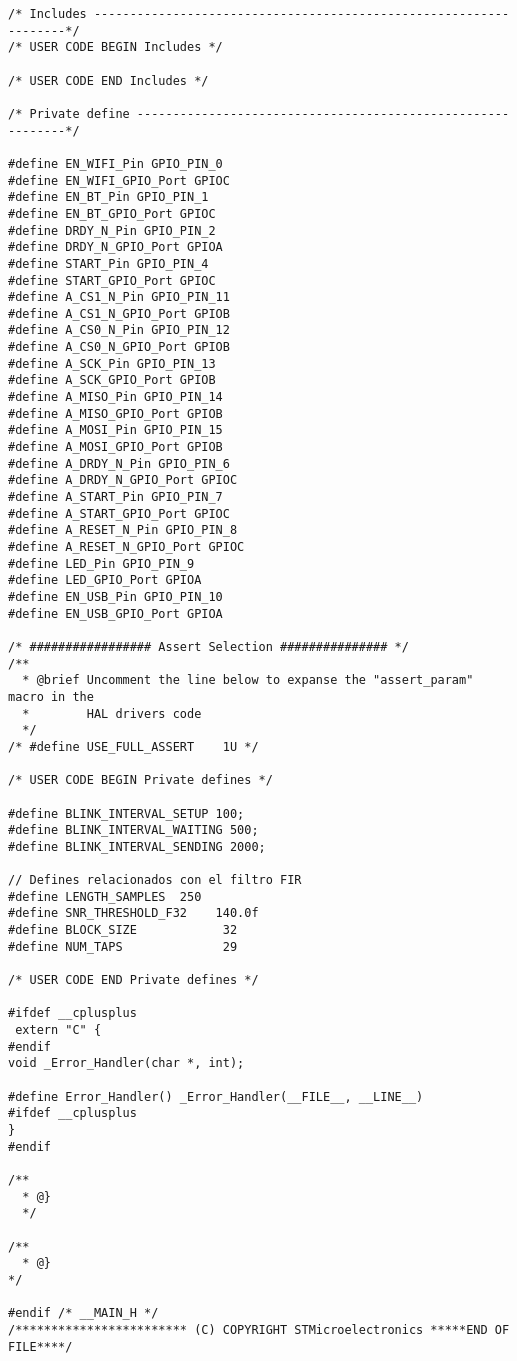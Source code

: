 \begin{lstlisting}[label=algoritmo:STM32F4:main.h,style = STM-code,frame=single,caption=STM32F4:main.h]
/* Includes ------------------------------------------------------------------*/
/* USER CODE BEGIN Includes */

/* USER CODE END Includes */

/* Private define ------------------------------------------------------------*/

#define EN_WIFI_Pin GPIO_PIN_0
#define EN_WIFI_GPIO_Port GPIOC
#define EN_BT_Pin GPIO_PIN_1
#define EN_BT_GPIO_Port GPIOC
#define DRDY_N_Pin GPIO_PIN_2
#define DRDY_N_GPIO_Port GPIOA
#define START_Pin GPIO_PIN_4
#define START_GPIO_Port GPIOC
#define A_CS1_N_Pin GPIO_PIN_11
#define A_CS1_N_GPIO_Port GPIOB
#define A_CS0_N_Pin GPIO_PIN_12
#define A_CS0_N_GPIO_Port GPIOB
#define A_SCK_Pin GPIO_PIN_13
#define A_SCK_GPIO_Port GPIOB
#define A_MISO_Pin GPIO_PIN_14
#define A_MISO_GPIO_Port GPIOB
#define A_MOSI_Pin GPIO_PIN_15
#define A_MOSI_GPIO_Port GPIOB
#define A_DRDY_N_Pin GPIO_PIN_6
#define A_DRDY_N_GPIO_Port GPIOC
#define A_START_Pin GPIO_PIN_7
#define A_START_GPIO_Port GPIOC
#define A_RESET_N_Pin GPIO_PIN_8
#define A_RESET_N_GPIO_Port GPIOC
#define LED_Pin GPIO_PIN_9
#define LED_GPIO_Port GPIOA
#define EN_USB_Pin GPIO_PIN_10
#define EN_USB_GPIO_Port GPIOA

/* ################# Assert Selection ############### */
/**
  * @brief Uncomment the line below to expanse the "assert_param" macro in the 
  *        HAL drivers code
  */
/* #define USE_FULL_ASSERT    1U */

/* USER CODE BEGIN Private defines */

#define BLINK_INTERVAL_SETUP 100;
#define BLINK_INTERVAL_WAITING 500;
#define BLINK_INTERVAL_SENDING 2000;

// Defines relacionados con el filtro FIR
#define LENGTH_SAMPLES  250
#define SNR_THRESHOLD_F32    140.0f
#define BLOCK_SIZE            32
#define NUM_TAPS              29

/* USER CODE END Private defines */

#ifdef __cplusplus
 extern "C" {
#endif
void _Error_Handler(char *, int);

#define Error_Handler() _Error_Handler(__FILE__, __LINE__)
#ifdef __cplusplus
}
#endif

/**
  * @}
  */ 

/**
  * @}
*/ 

#endif /* __MAIN_H */
/************************ (C) COPYRIGHT STMicroelectronics *****END OF FILE****/

\end{lstlisting}


